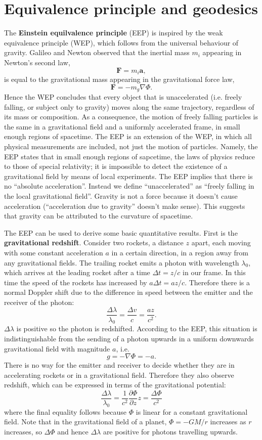 \documentclass[11pt]{article}
\begin{document}
\section{Equivalence principle and geodesics}

The \textbf{Einstein equilvalence principle} (EEP) is inspired by the weak equivalence principle (WEP), which follows from the universal behaviour of gravity.
Galileo and Newton observed that the inertial mass $m_i$ appearing in Newton's second law,
$$ \boldsymbol{F} = m_i \boldsymbol{a}, $$
is equal to the gravitational mass appearing in the gravitational force law,
$$ \boldsymbol{F} = -m_g \nabla \Phi. $$
Hence the WEP concludes that every object that is unaccelerated (i.e. freely falling, or subject only to gravity) moves along the same trajectory, regardless of its mass or composition. 
As a consequence, the motion of freely falling particles is the same in a gravitational field and a uniformly accelerated frame, in small enough regions of spacetime.
The EEP is an extension of the WEP, in which all physical measurements are included, not just the motion of particles.
Namely, the EEP states that in small enough regions of sapcetime, the laws of physics reduce to those of special relativity; it is impossible to detect the existence of a gravitational field by means of local experiments.
The EEP implies that there is no ``absolute acceleration''.
Instead we define ``unaccelerated'' as ``freely falling in the local gravitational field''.
Gravity is not a force because it doesn't cause acceleration (``acceleration due to gravity'' doesn't make sense).
This suggests that gravity can be attributed to the curvature of spacetime.

The EEP can be used to derive some basic quantitative results.
First is the \textbf{gravitational redshift}.
Consider two rockets, a distance $z$ apart, each moving with some constant acceleration $a$ in a certain direction, in a region away from any gravitational fields.
The trailing rocket emits a photon with wavelength $\lambda_0$, which arrives at the leading rocket after a time $\Delta t = z/c$ in our frame.
In this time the speed of the rockets has increased by $a \Delta t = az/c$.
Therefore there is a normal Doppler shift due to the difference in speed between the emitter and the receiver of the photon:
$$\frac{\Delta \lambda}{\lambda_0} = \frac{\Delta v}{c} =\frac{az}{c^2}.$$
$\Delta \lambda$ is positive so the photon is redshifted.
According to the EEP, this situation is indistinguishable from the sending of a photon upwards in a uniform downwards gravitational field with magnitude $a$, i.e.
$$ g = -\nabla \Phi = -a .$$
There is no way for the emitter and receiver to decide whether they are in accelerating rockets or in a gravitational field.
Therefore they also observe redshift, which can be expressed in terms of the gravitational potential:
$$ \frac{\Delta \lambda}{\lambda_0} = \frac{1}{c^2} \frac{\partial \Phi}{\partial z} z = \frac{\Delta \Phi}{c^2} $$
where the final equality follows because $\Phi$ is linear for a constant gravitational field.
Note that in the gravitational field of a planet, $\Phi = -G M/r$ increases as $r$ increases, so $\Delta \Phi$ and hence $\Delta \lambda$ are positive for photons travelling upwards.
\end{document}
